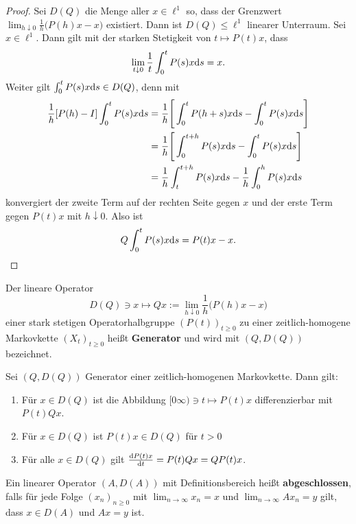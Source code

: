 \begin{proof}
  Sei $D(Q)$ die Menge aller $x\in\ell^1$ so, dass der Grenzwert $\lim_{h\downarrow 0}\frac{1}{h}\big(P(h)x-x\big)$ existiert. Dann ist $D(Q)\leq \ell^1$ linearer Unterraum. Sei $x\in\ell^1$. Dann gilt mit der starken Stetigkeit von $t\mapsto P(t)x$, dass $$\lim_{t\downarrow 0}\frac{1}{t}\int_0^t P(s)x\text ds=x.$$ Weiter gilt $\int_0^t P(s)x\text ds\in D(Q)$, denn mit
  \begin{align}
    \frac{1}{h}[P(h)-I]\int_0^tP(s)x\text ds
    &=\frac{1}{h}\Bigg[\int_0^t P(h+s)x\text ds-\int_0^tP(s)x\text ds\Bigg]\\
    &=\frac{1}{h}\Bigg[\int_0^{t+h}P(s)x\text ds-\int_0^t P(s)x\text ds\Bigg]\\
    &=\frac{1}{h}\int_t^{t+h}P(s)x\text ds-\frac{1}{h}\int_0^h P(s)x\text ds
  \end{align}
  konvergiert der zweite Term auf der rechten Seite gegen $x$ und der erste Term gegen $P(t)x$ mit $h\downarrow 0$. Also ist $$Q\int_0^t P(s)x\text ds=P(t)x-x.$$
\end{proof}

\begin{defi}[Generator]
  Der lineare Operator $$D(Q)\ni x\mapsto Qx:=\lim_{h\downarrow 0}\frac{1}{h}\big(P(h)x-x\big)$$ einer stark stetigen Operatorhalbgruppe $(P(t))_{t\geq0}$ zu einer zeitlich-homogene Markovkette $(X_t)_{t\geq0}$ heißt \textbf{Generator} und wird mit $(Q,D(Q))$ bezeichnet.
\end{defi}


\begin{mem}
  Sei $(Q,D(Q))$ Generator einer zeitlich-homogenen Markovkette. Dann gilt:
  \begin{enumerate}
    \item Für $x\in D(Q)$ ist die Abbildung $[0\infty)\ni t\mapsto P(t)x$ differenzierbar mit $P(t)Qx$.
    \item Für $x\in D(Q)$ ist $P(t)x\in D(Q)$ für $t>0$ 
    \item Für alle $x\in D(Q)$ gilt $\frac{\text d P(t)x}{\text dt}=P(t)Qx=QP(t)x$.
  \end{enumerate}
\end{mem}



\begin{defi}
 Ein linearer Operator $(A,D(A))$ mit Definitionsbereich heißt \textbf{abgeschlossen}, falls für jede Folge $(x_n)_{n\geq0}$ mit $\lim_{n\to\infty} x_n=x$ und $\lim_{n\to\infty} A x_n=y$ gilt, dass $x\in D(A)$ und $Ax=y$ ist. 
\end{defi}


